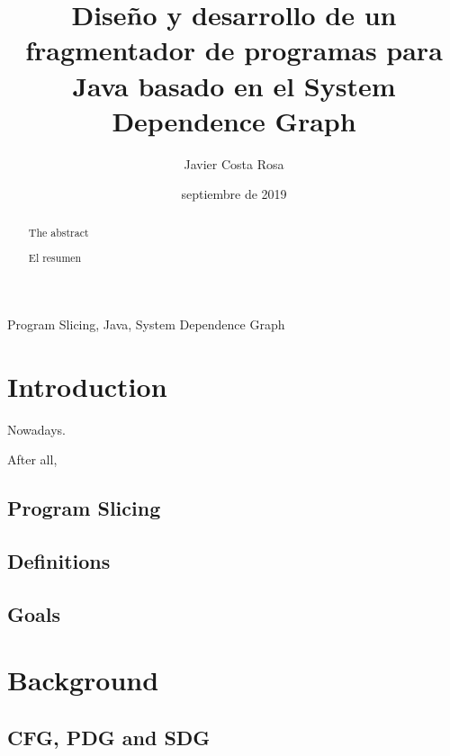 \documentclass[a4paper]{article}
\title{Diseño y desarrollo de un fragmentador de programas para Java basado en el System Dependence Graph}
\author{Javier Costa Rosa}
\date{septiembre de 2019}
\begin{document}

\maketitle

\begin{abstract}
	The abstract
\end{abstract}

\def\abstractname{{Resumen}}

\begin{abstract}
	El resumen
\end{abstract}

\vspace*{\fill}

\begin{keywords}
Program Slicing, Java, System Dependence Graph
\end{keywords}

\newpage

\tableofcontents

\newpage
 
\setlength{\parskip}{1em}

\section{Introduction} 

Nowadays.

After all, 

\subsection{Program Slicing}

\subsection{Definitions}

\subsection{Goals}

\section{Background}

\subsection{CFG, PDG and SDG}
\end{document}
